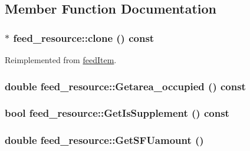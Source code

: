 \subsection{Member Function Documentation}
\hypertarget{classfeed__resource_ab5b47b60feeca736e185b15a5125836a}{
\subsubsection[{clone}]{ $\ast$ feed\_\-resource::clone () const}}
\label{classfeed__resource_ab5b47b60feeca736e185b15a5125836a}


Reimplemented from \hyperlink{classfeed_item_a7e3003ebb344d52fea31448657666253}{feedItem}.\hypertarget{classfeed__resource_ab215e26134aa4e9a7fa1f9231a9383a9}{
\subsubsection[{Getarea\_\-occupied}]{\setlength{\rightskip}{0pt plus 5cm}double feed\_\-resource::Getarea\_\-occupied () const}}
\label{classfeed__resource_ab215e26134aa4e9a7fa1f9231a9383a9}
\hypertarget{classfeed__resource_ac5177e819867cf7f0d958bd033fdc696}{
\subsubsection[{GetIsSupplement}]{\setlength{\rightskip}{0pt plus 5cm}bool feed\_\-resource::GetIsSupplement () const}}
\label{classfeed__resource_ac5177e819867cf7f0d958bd033fdc696}
\hypertarget{classfeed__resource_acf098bd410e8170e2bbd82be48b2bf40}{
\subsubsection[{GetSFUamount}]{\setlength{\rightskip}{0pt plus 5cm}double feed\_\-resource::GetSFUamount ()}}
